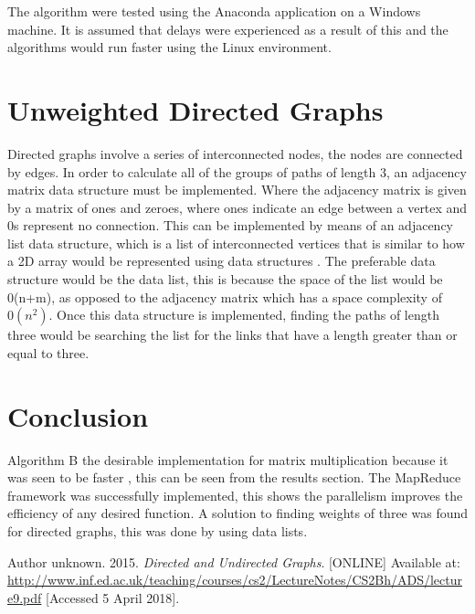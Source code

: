 \documentclass[twocolumn]{IEEEtran}
\begin{document}
The algorithm were tested using the Anaconda application on a Windows machine. It is assumed that delays were experienced as a result of this and the algorithms would run faster using the Linux environment.
	
	
	\section{Unweighted Directed Graphs}
	Directed graphs involve a series of interconnected nodes, the nodes are connected by edges. In order to calculate all of the groups of paths of length 3, an adjacency matrix data structure must be implemented. Where the adjacency matrix is given by a matrix of ones and zeroes, where ones indicate an edge between a vertex and 0s represent no connection. This can be implemented by means of an adjacency list data structure, which is a list of interconnected vertices that is similar to how a 2D array would be represented using data structures \cite{graph}. The preferable data structure would be the data list, this is because the space of the list would be 0(n+m), as opposed to the adjacency matrix which has a space  complexity of $0(n^{2})$.
	Once this data structure is implemented, finding the paths of length three would be searching the list for the links that have a length greater than or equal to three.


\section{Conclusion}
Algorithm B the desirable implementation for matrix multiplication because it was seen to be faster , this can be seen from the results section. The MapReduce framework was successfully implemented, this shows the parallelism improves the efficiency of any desired function. A solution to finding weights of three was found for directed graphs, this was done by using data lists.




	\begin{thebibliography}{12}
		Author unknown. 2015. \textit{Directed and Undirected Graphs}. [ONLINE] Available at: \url{http://www.inf.ed.ac.uk/teaching/courses/cs2/LectureNotes/CS2Bh/ADS/lecture9.pdf} [Accessed 5 April 2018].
	\end{thebibliography}
\end{document}
